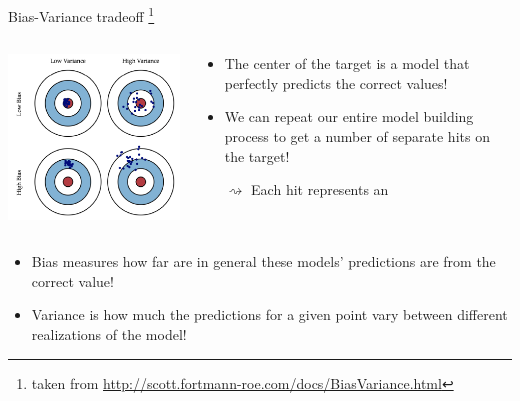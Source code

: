 \documentclass[xcolor={usenames,dvipsnames},handout]{beamer}
\begin{document}
\begin{frame}{Bias-Variance tradeoff}
\footnote{taken from \url{http://scott.fortmann-roe.com/docs/BiasVariance.html}}
\begin{columns}
\begin{column}{0.5\textwidth}
\includegraphics[width=\textwidth]{overfitting_cible}
\end{column}
\begin{column}{0.49\textwidth}
\begin{itemize}
\item The center of the target is a model that perfectly predicts the correct values!
\item We can repeat our entire model building process to get a number of separate hits on the target!

$\rightsquigarrow$ Each hit represents an 
\end{itemize}
\end{column}
\end{columns}
\begin{itemize}
\item Bias measures how far are in general these models' predictions are from the correct value!
\item  Variance is how much the predictions for a given point vary between different realizations of the model!
\end{itemize}
\end{frame}
\end{document}

